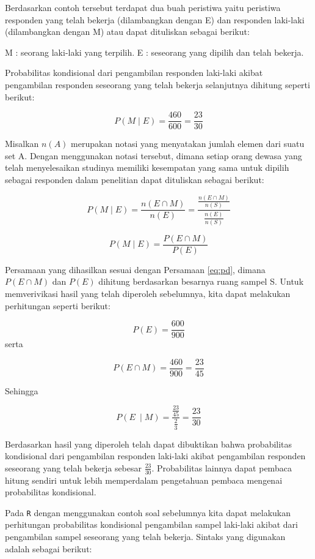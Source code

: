 \documentclass[]{book}
\begin{document}
Berdasarkan contoh tersebut terdapat dua buah peristiwa yaitu peristiwa
responden yang telah bekerja (dilambangkan dengan E) dan responden
laki-laki (dilambangkan dengan M) atau dapat dituliskan sebagai berikut:

M : seorang laki-laki yang terpilih. E : seseorang yang dipilih dan
telah bekerja.

Probabilitas kondisional dari pengambilan responden laki-laki akibat
pengambilan responden seseorang yang telah bekerja selanjutnya dihitung
seperti berikut:

\[
P\left(M\mid E\right)=\frac{460}{600}=\frac{23}{30}
\]

Misalkan \(n\left(A\right)\) merupakan notasi yang menyatakan jumlah
elemen dari suatu set A. Dengan menggunakan notasi tersebut, dimana
setiap orang dewasa yang telah menyelesaikan studinya memiliki
kesempatan yang sama untuk dipilih sebagai responden dalam penelitian
dapat dituliskan sebagai berikut:

\[
P\left(M\mid E\right)=\frac{n\left(E\cap M\right)}{n\left(E\right)}=\frac{\frac{n\left(E\cap M\right)}{n\left(S\right)}}{\frac{n\left(E\right)}{n\left(S\right)}}
\]

\[
P\left(M\mid E\right)=\frac{P\left(E\cap M\right)}{P\left(E\right)}
\]

Persamaan yang dihasilkan sesuai dengan Persamaan \eqref{eq:pd}, dimana
\(P\left(E\cap M\right)\) dan \(P\left(E\right)\) dihitung berdasarkan
besarnya ruang sampel S. Untuk memverivikasi hasil yang telah diperoleh
sebelumnya, kita dapat melakukan perhitungan seperti berikut:

\[
P\left(E\right)=\frac{600}{900}
\] serta

\[
P\left(E\cap M\right)=\frac{460}{900}=\frac{23}{45}
\]

Sehingga

\[
P\left(E\ \mid M\right)=\frac{\frac{23}{45}}{\frac{2}{3}}=\frac{23}{30}
\]

Berdasarkan hasil yang diperoleh telah dapat dibuktikan bahwa
probabilitas kondisional dari pengambilan responden laki-laki akibat
pengambilan responden seseorang yang telah bekerja sebesar
\(\frac{23}{30}\). Probabilitas lainnya dapat pembaca hitung sendiri
untuk lebih memperdalam pengetahuan pembaca mengenai probabilitas
kondisional.

Pada \texttt{R} dengan menggunakan contoh soal sebelumnya kita dapat
melakukan perhitungan probabilitas kondisional pengambilan sampel
laki-laki akibat dari pengambilan sampel seseorang yang telah bekerja.
Sintaks yang digunakan adalah sebagai berikut:
\end{document}

